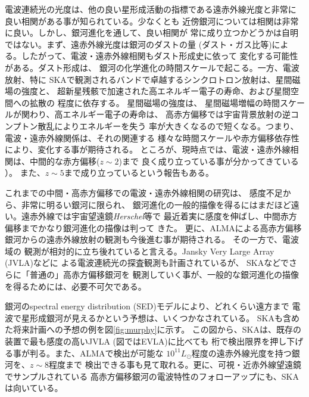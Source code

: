 電波連続光の光度は、他の良い星形成活動の指標である遠赤外線光度と非常に
良い相関がある事が知られている\citep{1992ARA&A..30..575C,2001ApJ...554..803Y}。少なくとも
近傍銀河については相関は非常に良い。しかし、銀河進化を通して、良い相関が
常に成り立つかどうかは自明ではない。まず、遠赤外線光度は銀河のダストの量
(ダスト・ガス比等)による。したがって、電波・遠赤外線相関もダスト形成史に依って
変化する可能性がある\citep{2013MNRAS.429.3390H}。ダスト形成は、
銀河の化学進化の時間スケールで起こる。一方、電波放射、特に
SKAで観測されるバンドで卓越するシンクロトロン放射は、星間磁場の強度と、
超新星残骸で加速された高エネルギー電子の寿命、および星間空間への拡散の
程度に依存する\citep{2006ApJ...651L.111M}。
星間磁場の強度は、
星間磁場増幅の時間スケールが関わり、高エネルギー電子の寿命は、
高赤方偏移では宇宙背景放射の逆コンプトン散乱によりエネルギーを失う
率が大きくなるので短くなる。つまり、電波・遠赤外線関係は、それの関連する
様々な時間スケールや赤方偏移依存性により、変化する事が期待される。
ところが、現時点では、電波・遠赤外線相関は、中間的な赤方偏移($z\sim 2$)まで
良く成り立っている事が分かってきている
\citep[e.g.,][]{2002A&A...384L..19G,2003MNRAS.341L...1G,2008MNRAS.386..953I,2009ApJ...706..482M}）。
また、$z\sim5$まで成り立っているという報告もある\citep{2010ApJ...712..942M}。

これまでの中間・高赤方偏移での電波・遠赤外線相関の研究は、
感度不足から、非常に明るい銀河に限られ、
銀河進化の一般的描像を得るにはまだほど遠い。遠赤外線では宇宙望遠鏡\textit{Herschel}等で
最近着実に感度を伸ばし、中間赤方偏移までかなり銀河進化の描像は判って
きた\citep{2014MNRAS.441.1017R}。
更に、ALMAによる高赤方偏移銀河からの遠赤外線放射の観測も今後進む事が期待される。
その一方で、電波域の
観測が相対的に立ち後れていると言える。Jansky Very Large Array (JVLA)などに
よる電波連続光の探査観測も計画されているが\citep{2014arXiv1401.4018J}、
SKAなどでさらに「普通の」高赤方偏移銀河を
観測していく事が、一般的な銀河進化の描像を得るためには、必要不可欠である。

銀河のspectral energy distribution (SED)モデルにより、どれくらい遠方まで
電波で星形成銀河が見えるかという予想は、いくつかなされている\citep{2001PASP..113..586T2}。
SKAも含めた将来計画への予想の例を図\ref{fig:murphy}に示す。
この図から、SKAは、既存の装置で最も感度の高いJVLA (図ではEVLA)に比べても
桁で検出限界を押し下げる事が判る。また、ALMAで検出が可能な
$10^{11}L_\odot$程度の遠赤外線光度を持つ銀河を、$z\sim 8$程度まで
検出できる事も見て取れる。更に、可視・近赤外線望遠鏡でサンプルされている
高赤方偏移銀河の電波特性のフォローアップにも、SKAは向いている。

